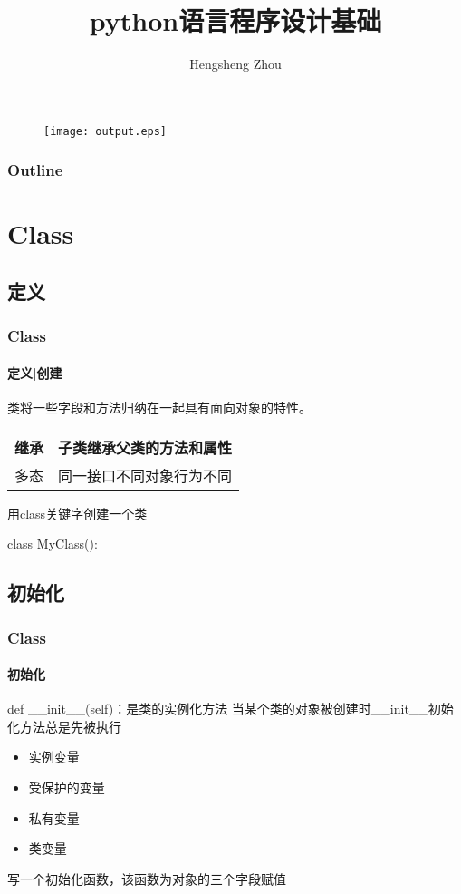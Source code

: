 \documentclass{beamer}
\title{python语言程序设计基础}
\author{Hengsheng Zhou}
\institute{电信与智能制造学院}
\begin{document}
\begin{frame}[t]
	\titlepage
	\begin{figure}
		\begin{center}
			\texttt{[image: output.eps]}
		\end{center}
	\end{figure}


\end{frame}
\begin{frame}
	\frametitle{Outline}
	\tableofcontents
\end{frame}
\section{Class}%
\subsection{定义}%
\begin{frame}[t]
	\frametitle{Class}
	\framesubtitle{定义|创建}
	类将一些字段和方法归纳在一起具有面向对象的特性。
	\pause
	\begin{center}
		\begin{tabular}{|c|c|}
			\hline
			继承 & 子类继承父类的方法和属性 \\
			\hline
			多态 & 同一接口不同对象行为不同 \\
			\hline
		\end{tabular}
	\end{center}
	\pause
	用class关键字创建一个类
	\begin{example}
		class MyClass():


	\end{example}
\end{frame}

\subsection{初始化}%
\begin{frame}[t]
	\frametitle{Class}
	\framesubtitle{初始化}
	def \_\_init\_\_(self)：是类的实例化方法
	当某个类的对象被创建时\_\_init\_\_初始化方法总是先被执行
	\pause
	\begin{itemize}
		\item 实例变量
		\item 受保护的变量
		\item 私有变量
		\item 类变量
	\end{itemize}
	\pause
	\begin{example}
		写一个初始化函数，该函数为对象的三个字段赋值
	\end{example}


\end{frame}
\end{document}
